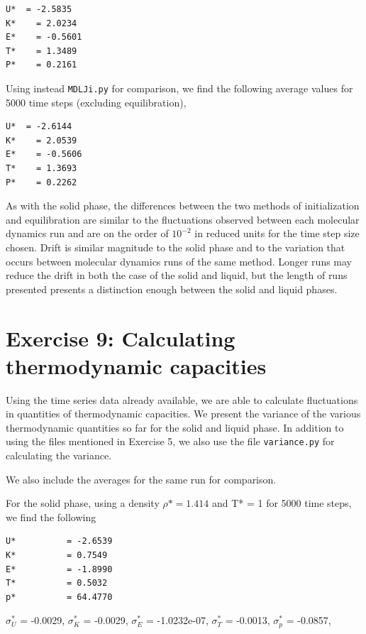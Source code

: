 \documentclass[12pt, oneside]{article}
\begin{document}
\begin{verbatim}
U* 	= -2.5835
K*    = 2.0234
E*    = -0.5601
T*    = 1.3489
P*    = 0.2161
\end{verbatim}

Using instead \verb!MDLJi.py! for comparison, we find the following average values for 5000 time steps (excluding equilibration), 

\begin{verbatim}
U* 	= -2.6144
K*    = 2.0539
E*    = -0.5606
T*    = 1.3693
P*    = 0.2262
\end{verbatim}

As with the solid phase, the differences between the two methods of initialization and equilibration are similar to the fluctuations observed between each molecular dynamics run and are on the order of $10^{-2}$ in reduced units for the time step size chosen. Drift is similar magnitude to the solid phase and to the variation that occurs between molecular dynamics runs of the same method. Longer runs may reduce the drift in both the case of the solid and liquid, but the length of runs presented presents a distinction enough between the solid and liquid phases.

\section{Exercise 9: Calculating thermodynamic capacities}

Using the time series data already available, we are able to calculate fluctuations in quantities of thermodynamic capacities. We present the variance of the various thermodynamic quantities so far for the solid and liquid phase. In addition to using the files mentioned in Exercise 5, we also use the file \verb!variance.py! for calculating the variance.

We also include the averages for the same run for comparison.

For the solid phase, using a density $\rho* = 1.414$ and T* = 1 for 5000 time steps, we find the following

\begin{verbatim}
U* 			= -2.6539
K*			= 0.7549
E* 			= -1.8990
T*			= 0.5032
p* 			= 64.4770
\end{verbatim}

$\sigma_{U}^*$ 	=  -0.0029,
$\sigma_{K}^*$ 	=  -0.0029,
$\sigma_{E}^*$	= -1.0232e-07,
$\sigma_{T}^*$	= -0.0013,
$\sigma_{p}^*$ 	= -0.0857,
\end{document}
